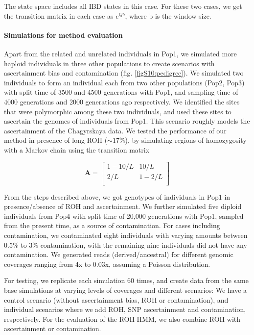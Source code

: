 \documentclass[12pt, letterpaper]{article}
\begin{document}
The state space includes all IBD states in this case. For these two cases, we get the transition matrix in each case as $e^{Qb}$, where b is the window size.


\paragraph{Simulations for method evaluation}
Apart from the related and unrelated individuals in Pop1, we simulated more haploid individuals in three other populations to create scenarios with ascertainment bias and contamination (fig. \ref{figS10:pedigree}). We simulated two individuals to form an individual each from two other populations (Pop2, Pop3) with split time of 3500 and 4500 generations with Pop1, and sampling time of 4000 generations and 2000 generations ago respectively.  We identified the sites that were polymorphic among these two individuals, and used these sites to ascertain the genomes of individuals from Pop1. This scenario roughly models the ascertainment of the Chagyrskaya data. We tested the performance of our method in presence of long ROH ($\sim17\%$), by simulating regions of homozygosity with a Markov chain using the transition matrix

$$\mathbf{A} = \left[\begin{array}
{rr}
1-10/L & 10/L \\
2/L & 1-2/L  \\
\end{array}\right]
$$

From the steps described above, we got genotypes of individuals in Pop1 in presence/absence of ROH and ascertainment. We further simulated five diploid individuals from Pop4 with split time of 20,000 generations with Pop1, sampled from the present time, as a source of contamination.  For cases including contamination, we contaminated eight individuals with varying amounts between 0.5\% to 3\% contamination, with the remaining  nine individuals did not have any contamination. We generated reads (derived/ancestral) for different genomic coverages ranging from 4x to 0.03x, assuming a Poisson distribution.

For testing, we replicate each simulation 60 times, and create data from the same base simulations at varying levels of coverages and different scenarios: We have a control scenario (without ascertainment bias, ROH or contamination), and individual scenarios where we add ROH, SNP ascertainment and contamination, respectively. For the evaluation of the ROH-HMM, we also combine ROH with ascertainment or contamination.
\end{document}
